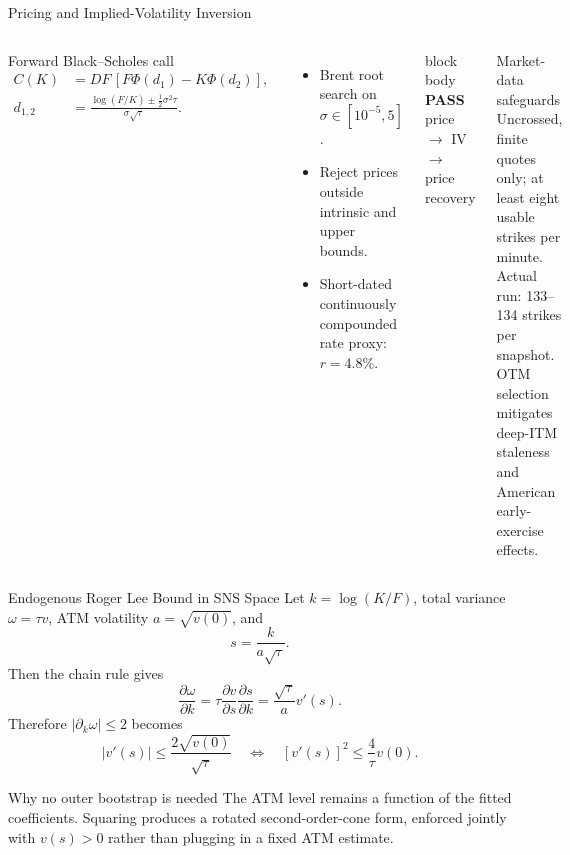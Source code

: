 \documentclass[aspectratio=169,10pt]{beamer}
\newcommand{\metric}[2]{%
  \begin{beamercolorbox}[rounded=true,sep=.55em,center,wd=\linewidth]{block body}
    {\color{navy}\Large\bfseries #1}\\[-0.1em]
    {\scriptsize #2}
  \end{beamercolorbox}}
\begin{document}
\begin{frame}{Pricing and Implied-Volatility Inversion}
\begin{columns}[T,onlytextwidth]
\begin{block}{Forward Black--Scholes call}
\begin{align*}
C(K)&=D\!F\,[F\Phi(d_1)-K\Phi(d_2)],\\
d_{1,2}&=\frac{\log(F/K)\pm\tfrac12\sigma^2\tau}{\sigma\sqrt{\tau}}.
\end{align*}
\end{block}
\begin{itemize}
  \item Brent root search on $\sigma\in[10^{-5},5]$.
  \item Reject prices outside intrinsic and upper bounds.
  \item Short-dated continuously compounded rate proxy: $r=4.8\%$.
\end{itemize}
\vspace{0.2cm}
\metric{PASS}{price $\rightarrow$ IV $\rightarrow$ price recovery}
\vspace{0.5cm}
\begin{block}{Market-data safeguards}
\small Uncrossed, finite quotes only; at least eight usable strikes per minute. Actual run: 133--134 strikes per snapshot. OTM selection mitigates deep-ITM staleness and American early-exercise effects.
\end{block}
\end{columns}
\end{frame}

\begin{frame}{Endogenous Roger Lee Bound in SNS Space}
Let $k=\log(K/F)$, total variance $\omega=\tau v$, ATM volatility $a=\sqrt{v(0)}$, and
\[s=\frac{k}{a\sqrt{\tau}}.\]
Then the chain rule gives
\[
\frac{\partial\omega}{\partial k}
=\tau\frac{\partial v}{\partial s}\frac{\partial s}{\partial k}
=\frac{\sqrt{\tau}}{a}v'(s).
\]
Therefore $|\partial_k\omega|\le 2$ becomes
\[
\boxed{|v'(s)|\le \frac{2\sqrt{v(0)}}{\sqrt{\tau}}}
\quad\Longleftrightarrow\quad
[v'(s)]^2\le\frac{4}{\tau}v(0).
\]
\begin{block}{Why no outer bootstrap is needed}
The ATM level remains a function of the fitted coefficients. Squaring produces a rotated second-order-cone form, enforced jointly with $v(s)>0$ rather than plugging in a fixed ATM estimate.
\end{block}
\end{frame}
\end{document}
